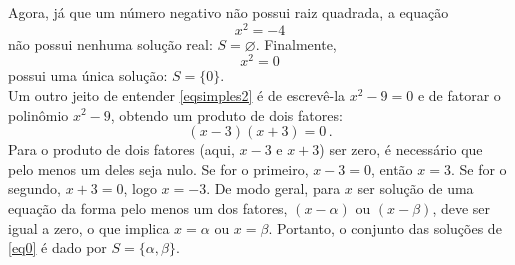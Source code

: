 Agora, já que um número negativo não possui raiz quadrada, a equação
$$
x^2=-4
$$
não possui nenhuma solução real: $S=\varnothing$. Finalmente, 
$$x^2=0$$
possui uma única solução: $S=\{0\}$.\\

 Um outro jeito de entender \eqref{eqsimples2} é de escrevê-la $x^2-9=0$ e de fatorar o
polinômio $x^2-9$, obtendo um produto de dois fatores:
$$(x-3)(x+3)=0\,.$$
 Para o produto de dois fatores (aqui, $x-3$ e $x+3$) ser zero, é necessário que pelo
menos um deles seja nulo. Se for o primeiro, $x-3=0$, então $x=3$. Se for o segundo,
$x+3=0$, logo $x=-3$. 
De modo geral, para $x$ ser solução de uma equação da forma 
pelo menos um dos fatores, $(x-\alpha)$ ou $(x-\beta)$, deve ser igual a zero, o que 
 implica $x=\alpha$ ou $x=\beta$. Portanto, o conjunto das soluções de \eqref{eq0} é dado
por 
$S=\{\alpha,\beta\}$.\\

